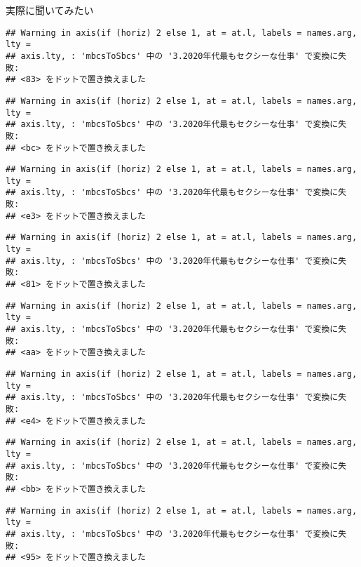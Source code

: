 \documentclass[ignorenonframetext,]{beamer}
\begin{document}
\begin{frame}[fragile]{実際に聞いてみたい}
\begin{verbatim}
## Warning in axis(if (horiz) 2 else 1, at = at.l, labels = names.arg, lty =
## axis.lty, : 'mbcsToSbcs' 中の '3.2020年代最もセクシーな仕事' で変換に失敗:
## <83> をドットで置き換えました
\end{verbatim}

\begin{verbatim}
## Warning in axis(if (horiz) 2 else 1, at = at.l, labels = names.arg, lty =
## axis.lty, : 'mbcsToSbcs' 中の '3.2020年代最もセクシーな仕事' で変換に失敗:
## <bc> をドットで置き換えました
\end{verbatim}

\begin{verbatim}
## Warning in axis(if (horiz) 2 else 1, at = at.l, labels = names.arg, lty =
## axis.lty, : 'mbcsToSbcs' 中の '3.2020年代最もセクシーな仕事' で変換に失敗:
## <e3> をドットで置き換えました
\end{verbatim}

\begin{verbatim}
## Warning in axis(if (horiz) 2 else 1, at = at.l, labels = names.arg, lty =
## axis.lty, : 'mbcsToSbcs' 中の '3.2020年代最もセクシーな仕事' で変換に失敗:
## <81> をドットで置き換えました
\end{verbatim}

\begin{verbatim}
## Warning in axis(if (horiz) 2 else 1, at = at.l, labels = names.arg, lty =
## axis.lty, : 'mbcsToSbcs' 中の '3.2020年代最もセクシーな仕事' で変換に失敗:
## <aa> をドットで置き換えました
\end{verbatim}

\begin{verbatim}
## Warning in axis(if (horiz) 2 else 1, at = at.l, labels = names.arg, lty =
## axis.lty, : 'mbcsToSbcs' 中の '3.2020年代最もセクシーな仕事' で変換に失敗:
## <e4> をドットで置き換えました
\end{verbatim}

\begin{verbatim}
## Warning in axis(if (horiz) 2 else 1, at = at.l, labels = names.arg, lty =
## axis.lty, : 'mbcsToSbcs' 中の '3.2020年代最もセクシーな仕事' で変換に失敗:
## <bb> をドットで置き換えました
\end{verbatim}

\begin{verbatim}
## Warning in axis(if (horiz) 2 else 1, at = at.l, labels = names.arg, lty =
## axis.lty, : 'mbcsToSbcs' 中の '3.2020年代最もセクシーな仕事' で変換に失敗:
## <95> をドットで置き換えました
\end{verbatim}


\end{frame}
\end{document}
